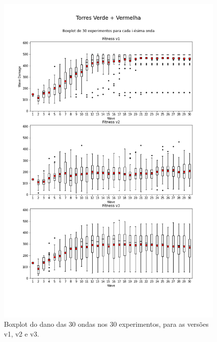\begin{figure}[H]
  \centering
  \includegraphics[width=1.1\textwidth]{figuras/td/boxplot Torres Verde + Vermelha.png}
  \caption{Boxplot do dano das 30 ondas nos 30 experimentos, para as versões v1, v2 e v3.}
  \label{td-box-gr}
\end{figure}

